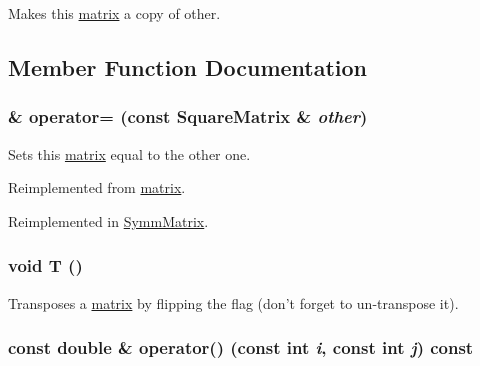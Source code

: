 Makes this \hyperlink{classJKBuilder_1_1matrix}{matrix} a copy of other. 

\subsection{Member Function Documentation}
\hypertarget{classJKBuilder_1_1SquareMatrix_ad78e5a12d26f1984d77a57095bc4d181}{
\subsubsection[{operator=}]{ \& operator= (const {\bf SquareMatrix} \& {\em other})}}
\label{classJKBuilder_1_1SquareMatrix_ad78e5a12d26f1984d77a57095bc4d181}


Sets this \hyperlink{classJKBuilder_1_1matrix}{matrix} equal to the other one. 

Reimplemented from \hyperlink{classJKBuilder_1_1matrix_a11df53cc3fc568369a9f612cfb556680}{matrix}.

Reimplemented in \hyperlink{classJKBuilder_1_1SymmMatrix_aca4a8297278ff39c5422febf1dcbc5ac}{SymmMatrix}.\hypertarget{classJKBuilder_1_1matrix_af2563817f6505e9f8a6ee5c5c209a115}{
\subsubsection[{T}]{\setlength{\rightskip}{0pt plus 5cm}void T ()}}
\label{classJKBuilder_1_1matrix_af2563817f6505e9f8a6ee5c5c209a115}


Transposes a \hyperlink{classJKBuilder_1_1matrix}{matrix} by flipping the flag (don't forget to un-\/transpose it). \hypertarget{classJKBuilder_1_1matrix_a9ccbac42f4eefb704f04886001f4fb3e}{
\subsubsection[{operator()}]{\setlength{\rightskip}{0pt plus 5cm}const double \& operator() (const int {\em i}, \/  const int {\em j}) const}}
\label{classJKBuilder_1_1matrix_a9ccbac42f4eefb704f04886001f4fb3e}


